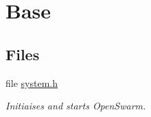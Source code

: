 \hypertarget{group__base}{}\section{Base}
\label{group__base}
\subsection*{Files}
\begin{DoxyCompactItemize}
\item 
file \hyperlink{system_8h}{system.\+h}
\begin{DoxyCompactList}\small\item\em Initiaises and starts Open\+Swarm. \end{DoxyCompactList}\end{DoxyCompactItemize}


